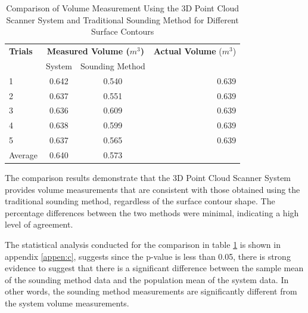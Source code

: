 \begin{table}[H]
	\centering
	\begin{threeparttable}
		\caption{Comparison of Volume Measurement Using the 3D Point Cloud Scanner System and Traditional Sounding Method for Different Surface Contours}
		\label{ch4:tab:comparision-system-sounding}
		\begin{tabular}{l c c r}
			\toprule
			\textbf{Trials} & \multicolumn{2}{c}{\textbf{Measured Volume ($m^{3}$)}} & \textbf{Actual Volume} ($m^{3}$)         \\
			{}              & System                                                 & Sounding Method                  & {}    \\ \midrule
			1               & 0.642                                                  & 0.540                            & 0.639 \\
			2               & 0.637                                                  & 0.551                            & 0.639 \\
			3               & 0.636                                                  & 0.609                            & 0.639 \\
			4               & 0.638                                                  & 0.599                            & 0.639 \\
			5               & 0.637                                                  & 0.565                            & 0.639 \\ \midrule
			Average         & 0.640                                                  & 0.573                            & {}    \\ \bottomrule
		\end{tabular}
	\end{threeparttable}
\end{table}

The comparison results demonstrate that the 3D Point Cloud Scanner System provides volume measurements that are consistent with those obtained using the traditional sounding method, regardless of the surface contour shape. The percentage differences between the two methods were minimal, indicating a high level of agreement.

The statistical analysis conducted for the comparison in table \ref{ch4:tab:comparision-system-sounding} is shown in appendix \ref{appen:c}, suggests since the p-value is less than 0.05, there is strong evidence to suggest that there is a significant difference between the sample mean of the sounding method data and the population mean of the system data. In other words, the sounding method measurements are significantly different from the system volume measurements.

